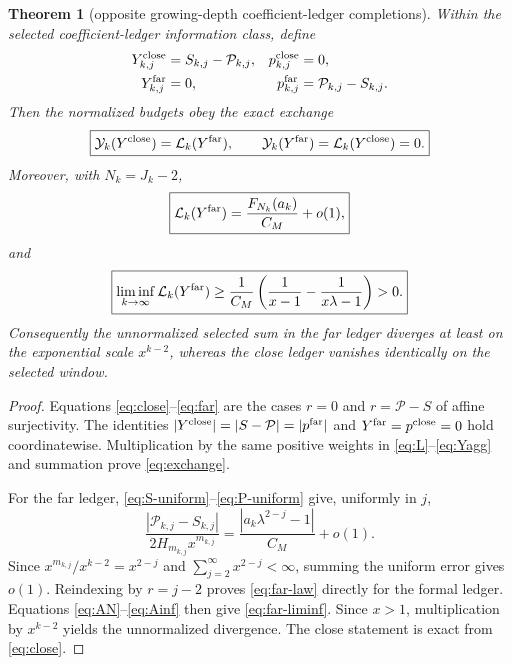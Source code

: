 \documentclass[11pt]{article}
\newtheorem{theorem}{Theorem}[section]
\theoremstyle{definition}
\theoremstyle{remark}
\newcommand{\cP}{\mathcal P}
\newcommand{\cY}{\mathcal Y}
\newcommand{\cL}{\mathcal L}
\begin{document}
\begin{theorem}[opposite growing-depth coefficient-ledger completions]
Within the selected coefficient-ledger information class, define
\begin{align}
 Y^{\rm close}_{k,j}&=S_{k,j}-\cP_{k,j},
 &p^{\rm close}_{k,j}&=0,
 \label{eq:close}\\
 Y^{\rm far}_{k,j}&=0,
 &p^{\rm far}_{k,j}&=\cP_{k,j}-S_{k,j}.
 \label{eq:far}
\end{align}
Then the normalized budgets obey the exact exchange
\begin{equation}\label{eq:exchange}
 \boxed{
 \cY_k(Y^{\rm close})=\cL_k(Y^{\rm far}),
 \qquad
 \cY_k(Y^{\rm far})=\cL_k(Y^{\rm close})=0.}
\end{equation}
Moreover, with $N_k=J_k-2$,
\begin{equation}\label{eq:far-law}
 \boxed{
 \cL_k(Y^{\rm far})
 =\frac{F_{N_k}(a_k)}{C_M}+o(1),}
\end{equation}
and
\begin{equation}\label{eq:far-liminf}
 \boxed{
 \liminf_{k\to\infty}\cL_k(Y^{\rm far})
 \ge\frac1{C_M}
 \left(\frac1{x-1}-\frac1{x\lambda-1}\right)>0.}
\end{equation}
Consequently the unnormalized selected sum in the far ledger diverges at
least on the exponential scale $x^{k-2}$, whereas the close ledger vanishes
identically on the selected window.
\end{theorem}

\begin{proof}
Equations \eqref{eq:close}--\eqref{eq:far} are the cases $r=0$ and
$r=\cP-S$ of affine surjectivity.  The identities
$|Y^{\rm close}|=|S-\cP|=|p^{\rm far}|$ and
$Y^{\rm far}=p^{\rm close}=0$ hold coordinatewise.  Multiplication by the
same positive weights in \eqref{eq:L}--\eqref{eq:Yagg} and summation prove
\eqref{eq:exchange}.

For the far ledger, \eqref{eq:S-uniform}--\eqref{eq:P-uniform} give,
uniformly in $j$,
\[
 \frac{|\cP_{k,j}-S_{k,j}|}
 {2H_{m_{k,j}}x^{m_{k,j}}}
 =\frac{|a_k\lambda^{2-j}-1|}{C_M}+o(1).
\]
Since $x^{m_{k,j}}/x^{k-2}=x^{2-j}$ and
$\sum_{j=2}^{\infty}x^{2-j}<\infty$, summing the uniform error gives
$o(1)$.  Reindexing by $r=j-2$ proves \eqref{eq:far-law} directly for the
formal ledger.  Equations \eqref{eq:AN}--\eqref{eq:Ainf} then give
\eqref{eq:far-liminf}.  Since $x>1$, multiplication by $x^{k-2}$ yields the
unnormalized divergence.  The close statement is exact from
\eqref{eq:close}.
\end{proof}
\end{document}
